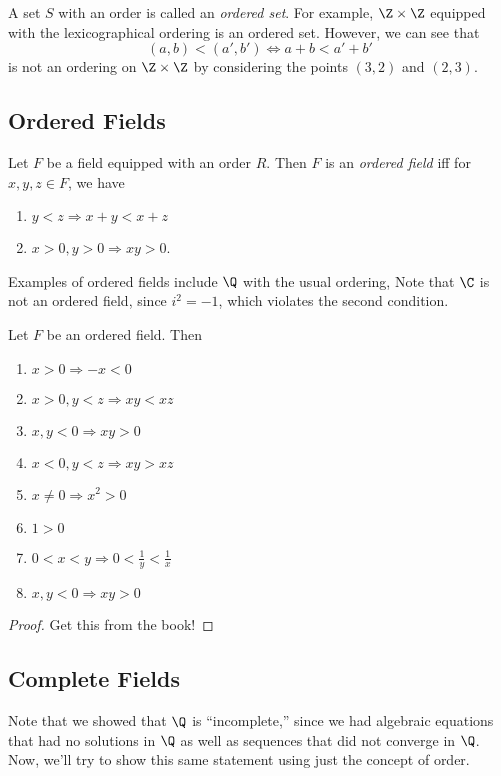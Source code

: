 \documentclass{notes}
\begin{document}
A set $S$ with an order is called an \emph{ordered set}. For example, $\Z\times\Z$ equipped with the
lexicographical ordering is an ordered set. However, we can see that $$(a,b) < (a', b') \Leftrightarrow
a + b < a' + b'$$ is not an ordering on $\Z\times\Z$ by considering the points $(3,2)$ and $(2,3)$. 

\subsection{Ordered Fields}
Let $F$ be a field equipped with an order $R$. Then $F$ is an \emph{ordered field} iff for $x,y,z\in F$, 
we have 
\begin{enumerate}
    \item $y < z \Rightarrow x+ y < x + z$
    \item $x > 0, y>0 \Rightarrow xy > 0$.
\end{enumerate}
Examples of ordered fields include $\Q$ with the usual ordering, Note that $\C$ is not an ordered field,
since $i^2 = -1$, which violates the second condition.

\begin{proposition}
  Let $F$ be an ordered field. Then 
  \begin{enumerate}
    \item $x > 0 \Rightarrow -x < 0$
    \item $x > 0, y<z \Rightarrow xy < xz$
    \item $x,y < 0 \Rightarrow xy > 0$
    \item $x < 0, y < z \Rightarrow xy > xz$
    \item $x\neq 0 \Rightarrow x^2 > 0$
    \item $1 > 0$
    \item $0 < x < y \Rightarrow 0 < \frac{1}{y} < \frac{1}{x}$
    \item $x,y < 0 \Rightarrow xy > 0$
  \end{enumerate}
\end{proposition}

\begin{proof}
  Get this from the book!
\end{proof}

\subsection{Complete Fields}
Note that we showed that $\Q$ is ``incomplete,'' since we had algebraic equations that had no solutions
in $\Q$ as well as sequences that did not converge in $\Q$. Now, we'll try to show this same statement 
using just the concept of order. \\
\end{document}

